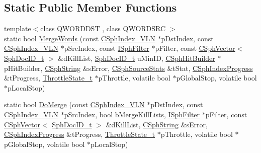 \subsection*{Static Public Member Functions}
\begin{DoxyCompactItemize}
\item 
{\footnotesize template$<$class Q\-W\-O\-R\-D\-D\-S\-T , class Q\-W\-O\-R\-D\-S\-R\-C $>$ }\\static bool \hyperlink{classCSphIndex__VLN_a8ceb4d3ddede6869549bde0ad4883ab4}{Merge\-Words} (const \hyperlink{classCSphIndex__VLN}{C\-Sph\-Index\-\_\-\-V\-L\-N} $\ast$p\-Dst\-Index, const \hyperlink{classCSphIndex__VLN}{C\-Sph\-Index\-\_\-\-V\-L\-N} $\ast$p\-Src\-Index, const \hyperlink{structISphFilter}{I\-Sph\-Filter} $\ast$p\-Filter, const \hyperlink{classCSphVector}{C\-Sph\-Vector}$<$ \hyperlink{sphinx_8h_a3176771631c12a9e4897272003e6b447}{Sph\-Doc\-I\-D\-\_\-t} $>$ \&d\-Kill\-List, \hyperlink{sphinx_8h_a3176771631c12a9e4897272003e6b447}{Sph\-Doc\-I\-D\-\_\-t} u\-Min\-I\-D, \hyperlink{classCSphHitBuilder}{C\-Sph\-Hit\-Builder} $\ast$p\-Hit\-Builder, \hyperlink{structCSphString}{C\-Sph\-String} \&s\-Error, \hyperlink{structCSphSourceStats}{C\-Sph\-Source\-Stats} \&t\-Stat, \hyperlink{structCSphIndexProgress}{C\-Sph\-Index\-Progress} \&t\-Progress, \hyperlink{structThrottleState__t}{Throttle\-State\-\_\-t} $\ast$p\-Throttle, volatile bool $\ast$p\-Global\-Stop, volatile bool $\ast$p\-Local\-Stop)
\item 
static bool \hyperlink{classCSphIndex__VLN_ade93dc6220b418e1c93eee78b5e5b4df}{Do\-Merge} (const \hyperlink{classCSphIndex__VLN}{C\-Sph\-Index\-\_\-\-V\-L\-N} $\ast$p\-Dst\-Index, const \hyperlink{classCSphIndex__VLN}{C\-Sph\-Index\-\_\-\-V\-L\-N} $\ast$p\-Src\-Index, bool b\-Merge\-Kill\-Lists, \hyperlink{structISphFilter}{I\-Sph\-Filter} $\ast$p\-Filter, const \hyperlink{classCSphVector}{C\-Sph\-Vector}$<$ \hyperlink{sphinx_8h_a3176771631c12a9e4897272003e6b447}{Sph\-Doc\-I\-D\-\_\-t} $>$ \&d\-Kill\-List, \hyperlink{structCSphString}{C\-Sph\-String} \&s\-Error, \hyperlink{structCSphIndexProgress}{C\-Sph\-Index\-Progress} \&t\-Progress, \hyperlink{structThrottleState__t}{Throttle\-State\-\_\-t} $\ast$p\-Throttle, volatile bool $\ast$p\-Global\-Stop, volatile bool $\ast$p\-Local\-Stop)
\end{DoxyCompactItemize}
